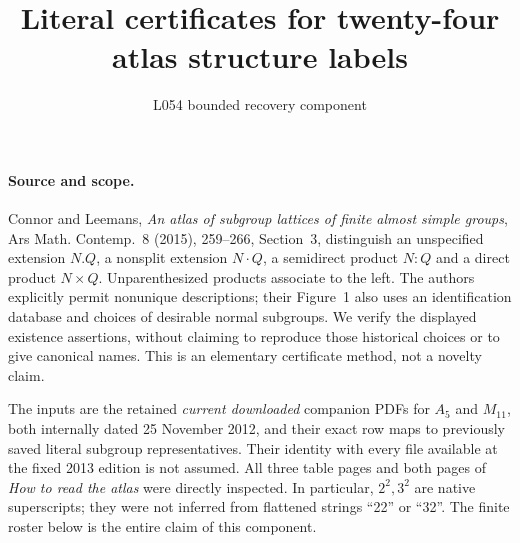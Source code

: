\documentclass[10pt]{article}
\title{Literal certificates for twenty-four atlas structure labels}
\author{L054 bounded recovery component}
\date{}
\begin{document}
\maketitle

\paragraph{Source and scope.}
Connor and Leemans, \emph{An atlas of subgroup lattices of finite almost
simple groups}, Ars Math. Contemp.\ 8 (2015), 259--266, Section~3,
distinguish an unspecified extension $N.Q$, a nonsplit extension $N\cdot Q$,
a semidirect product $N:Q$ and a direct product $N\times Q$. Unparenthesized
products associate to the left. The authors explicitly permit nonunique
descriptions; their Figure~1 also uses an identification database and choices
of desirable normal subgroups. We verify the displayed existence assertions,
without claiming to reproduce those historical choices or to give canonical
names. This is an elementary certificate method, not a novelty claim.

The inputs are the retained \emph{current downloaded} companion PDFs for
$A_5$ and $M_{11}$, both internally dated 25 November 2012, and their exact
row maps to previously saved literal subgroup representatives. Their
identity with every file available at the fixed 2013 edition is not assumed.
All three table pages and both pages of \emph{How to read the atlas} were
directly inspected. In particular, $2^2,3^2$ are native superscripts;
they were not inferred from flattened strings ``22'' or ``32''.
The finite roster below is the entire claim of this component.
\end{document}
